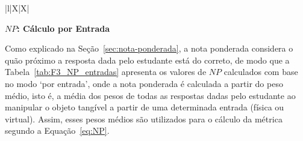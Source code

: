 \begin{table}[htbp]
\begin{xltabular}{\textwidth}{|l|X|X|}
		\\ \hline
		
	\end{xltabular}
	\label{tab:F3_NP_Exemplo}
\end{table}

\textbf{$NP$: Cálculo por Entrada}

Como explicado na Seção~\ref{sec:nota-ponderada}, a nota ponderada considera o quão próximo a resposta dada pelo estudante está do correto, de modo que a Tabela~\ref{tab:F3_NP_entradas} apresenta os valores de $NP$ calculados com base no modo `por entrada', onde a nota ponderada é calculada a partir do peso médio, isto é, a média dos pesos de todas as respostas dadas pelo estudante ao manipular o objeto tangível a partir de uma determinada entrada (física ou virtual). Assim, esses pesos médios são utilizados para o cálculo da métrica segundo a Equação~\ref{eq:NP}.

